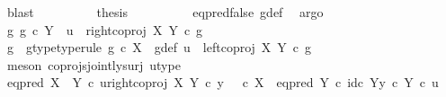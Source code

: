\begin{isabellebody}
\ blast\isanewline
\ \ \ \ \ \ \isamarkupfalse%
\ \isamarkupfalse%
\ {\isacharquery}{\kern0pt}thesis\isanewline
\ \ \ \ \ \ \ \ \isamarkupfalse%
\ eq{\isacharunderscore}{\kern0pt}pred{\isacharunderscore}{\kern0pt}false\ g{\isacharunderscore}{\kern0pt}def\ \isamarkupfalse%
\ argo\isanewline
\ \ \ \ \isamarkupfalse%
\isanewline
\ \ \isamarkupfalse%
\isanewline
\ \ \ \ \isamarkupfalse%
\ {\isachardoublequoteopen}{\isasymnexists}g{\isachardot}{\kern0pt}\ g\ {\isasymin}\isactrlsub c\ Y\ {\isasymand}\ u\ {\isacharequal}{\kern0pt}\ right{\isacharunderscore}{\kern0pt}coproj\ X\ Y\ {\isasymcirc}\isactrlsub c\ g{\isachardoublequoteclose}\isanewline
\ \ \ \ \isamarkupfalse%
\ \isamarkupfalse%
\ g\ \ g{\isacharunderscore}{\kern0pt}type{\isacharbrackleft}{\kern0pt}type{\isacharunderscore}{\kern0pt}rule{\isacharbrackright}{\kern0pt}{\isacharcolon}{\kern0pt}\ {\isachardoublequoteopen}g\ {\isasymin}\isactrlsub c\ X{\isachardoublequoteclose}\ \ g{\isacharunderscore}{\kern0pt}def{\isacharcolon}{\kern0pt}\ {\isachardoublequoteopen}u\ {\isacharequal}{\kern0pt}\ left{\isacharunderscore}{\kern0pt}coproj\ X\ Y\ {\isasymcirc}\isactrlsub c\ g{\isachardoublequoteclose}\isanewline
\ \ \ \ \ \ \isamarkupfalse%
\ {\isacharparenleft}{\kern0pt}meson\ coprojs{\isacharunderscore}{\kern0pt}jointly{\isacharunderscore}{\kern0pt}surj\ u{\isacharunderscore}{\kern0pt}type{\isacharparenright}{\kern0pt}\isanewline
\ \ \ \ \isamarkupfalse%
\ {\isachardoublequoteopen}eq{\isacharunderscore}{\kern0pt}pred\ {\isacharparenleft}{\kern0pt}X\ {\isasymCoprod}\ Y{\isacharparenright}{\kern0pt}\ {\isasymcirc}\isactrlsub c\ {\isasymlangle}u{\isacharcomma}{\kern0pt}right{\isacharunderscore}{\kern0pt}coproj\ X\ Y\ {\isasymcirc}\isactrlsub c\ y{\isasymrangle}\ {\isacharequal}{\kern0pt}\ {\isacharparenleft}{\kern0pt}{\isasymf}\ {\isasymcirc}\isactrlsub c\ {\isasymbeta}\isactrlbsub X\isactrlesub {\isacharparenright}{\kern0pt}\ {\isasymamalg}\ {\isacharparenleft}{\kern0pt}eq{\isacharunderscore}{\kern0pt}pred\ Y\ {\isasymcirc}\isactrlsub c\ {\isasymlangle}id\isactrlsub c\ Y{\isacharcomma}{\kern0pt}y\ {\isasymcirc}\isactrlsub c\ {\isasymbeta}\isactrlbsub Y\isactrlesub {\isasymrangle}{\isacharparenright}{\kern0pt}\ {\isasymcirc}\isactrlsub c\ u{\isachardoublequoteclose}\isanewline
\ \ \ \ \isamarkupfalse%
\ {\isacharminus}{\kern0pt}\isanewline
\ \ \ \ \ \ \isamarkupfalse%

\end{isabellebody}
